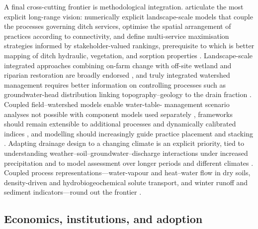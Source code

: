 \documentclass[11pt]{article}
\begin{document}
A final cross-cutting frontier is methodological integration.
\textcite{Dollinger2015} articulate the most explicit long-range vision:
numerically explicit landscape-scale models that couple the processes governing
ditch services, optimise the spatial arrangement of practices according to
connectivity, and define multi-service maximisation strategies informed by
stakeholder-valued rankings, prerequisite to which is better mapping of ditch
hydraulic, vegetation, and sorption properties \parencite{Dollinger2015,Herzon2008}.
Landscape-scale integrated approaches combining on-farm change with off-site
wetland and riparian restoration are broadly endorsed
\parencite{Blann2009,Goeller2019}, and truly integrated watershed management
requires better information on controlling processes such as
groundwater-head distribution linking topography--geology to the drain fraction
\parencite{Mahmood2023}. Coupled field--watershed models enable water-table-
management scenario analyses not possible with component models used separately
\parencite{Dayyani2010}, frameworks should remain extensible to additional
processes and dynamically calibrated indices \parencite{Basu2010,Tao2025,Verma2014},
and modelling should increasingly guide practice placement and stacking
\parencite{Kröger2013,Tomer2015,Lemke2011,McDowell2021,King2022,Roley2016}.
Adapting drainage design to a changing climate is an explicit priority, tied to
understanding weather--soil--groundwater--discharge interactions under increased
precipitation and to model assessment over longer periods and different climates
\parencite{Deelstra2015,Tuohy2018,Malota2024,Deelstra2014,Deelstra2014b}. Coupled
process representations---water-vapour and heat--water flow in dry soils,
density-driven and hydrobiogeochemical solute transport, and winter runoff and
sediment indicators---round out the frontier
\parencite{Moroizumi2004,Koivusalo1999,Salo2015,Varvaris2018,Augeard2005}.

\subsection{Economics, institutions, and adoption}
\end{document}
